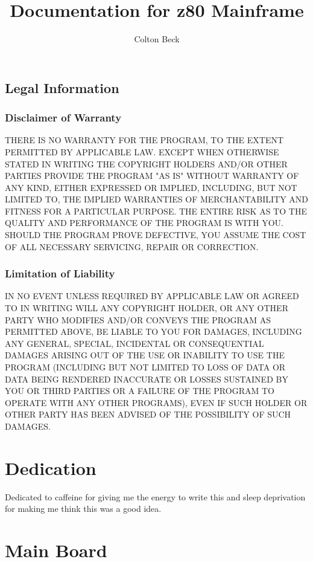 \documentclass{book}
\begin{document}
\frontmatter
\title{Documentation for z80 Mainframe}
\author{Colton Beck}
\maketitle
\section*{Legal Information}
\subsection*{Disclaimer of Warranty}

  THERE IS NO WARRANTY FOR THE PROGRAM, TO THE EXTENT PERMITTED BY
APPLICABLE LAW.  EXCEPT WHEN OTHERWISE STATED IN WRITING THE COPYRIGHT
HOLDERS AND/OR OTHER PARTIES PROVIDE THE PROGRAM "AS IS" WITHOUT WARRANTY
OF ANY KIND, EITHER EXPRESSED OR IMPLIED, INCLUDING, BUT NOT LIMITED TO,
THE IMPLIED WARRANTIES OF MERCHANTABILITY AND FITNESS FOR A PARTICULAR
PURPOSE.  THE ENTIRE RISK AS TO THE QUALITY AND PERFORMANCE OF THE PROGRAM
IS WITH YOU.  SHOULD THE PROGRAM PROVE DEFECTIVE, YOU ASSUME THE COST OF
ALL NECESSARY SERVICING, REPAIR OR CORRECTION.

\subsection*{Limitation of Liability}

  IN NO EVENT UNLESS REQUIRED BY APPLICABLE LAW OR AGREED TO IN WRITING
WILL ANY COPYRIGHT HOLDER, OR ANY OTHER PARTY WHO MODIFIES AND/OR CONVEYS
THE PROGRAM AS PERMITTED ABOVE, BE LIABLE TO YOU FOR DAMAGES, INCLUDING ANY
GENERAL, SPECIAL, INCIDENTAL OR CONSEQUENTIAL DAMAGES ARISING OUT OF THE
USE OR INABILITY TO USE THE PROGRAM (INCLUDING BUT NOT LIMITED TO LOSS OF
DATA OR DATA BEING RENDERED INACCURATE OR LOSSES SUSTAINED BY YOU OR THIRD
PARTIES OR A FAILURE OF THE PROGRAM TO OPERATE WITH ANY OTHER PROGRAMS),
EVEN IF SUCH HOLDER OR OTHER PARTY HAS BEEN ADVISED OF THE POSSIBILITY OF
SUCH DAMAGES.
\chapter*{Dedication}
Dedicated to caffeine for giving me the energy to write this and sleep deprivation for making me think this was a good idea.
\tableofcontents
\listoffigures
\listoftables
\mainmatter
\chapter{Main Board}
\nocite{*}
\end{document}
